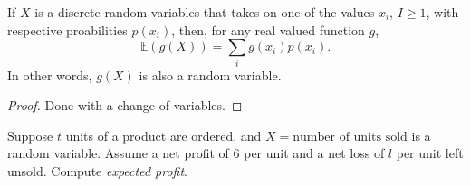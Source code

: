
\begin{prop}
	If \( X \) is a discrete random variables that takes on one of the values \( x_i \), \( I\ge 1 \), with respective proabilities \( p(x_i) \), then, for any real valued function \( g \), \[
		\mathbb{E}(g(X)) = \sum_{i} g(x_i)p(x_i)
	.\] In other words, \( g(X) \) is also a random variable.
\end{prop}
\begin{proof}
	Done with a change of variables.
\end{proof}

\begin{eg}
	Suppose \( t \) units of a product are ordered, and \( X = \text{number of units sold} \) is a random variable. Assume a net profit of 6 per unit and a net loss of \( l \) per unit left unsold. Compute \textit{expected profit}.
\end{eg}
